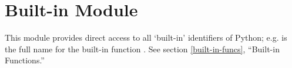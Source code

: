 \section{Built-in Module }



This module provides direct access to all `built-in' identifiers of
Python; e.g.  is the full name for the built-in
function .  See section \ref{built-in-funcs}, ``Built-in
Functions.''
